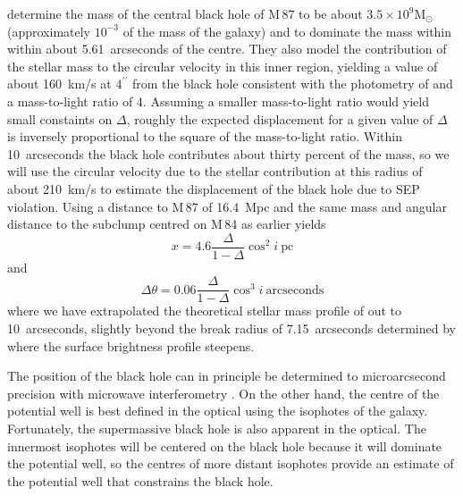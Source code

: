 \documentclass[useAMS,usenatbib]{mn2e}
\newcommand{\msun}{\mathrm{M}_\odot}
\begin{document}
\citet{2013ApJ...770...86W} determine the mass of the central black
hole of M\,87 to be about $3.5 \times 10^{9} \msun$ (approximately
$10^{-3}$ of the mass of the galaxy) and to dominate the mass within
within about 5.61~arcseconds of the centre.  They also model the
contribution of the stellar mass to the circular velocity in this
inner region, yielding a value of about 160~km/s at $4^{\prime\prime}$
from the black hole consistent with the photometry of
\citet{2006ApJS..164..334F} and a mass-to-light ratio of 4. Assuming a
smaller mass-to-light ratio would yield small constaints on $\Delta$,
roughly the expected displacement for a given value of $\Delta$ is
inversely proportional to the square of the mass-to-light ratio.
Within 10~arcseconds the black hole contributes about thirty percent
of the mass, so we will use the circular velocity due to the stellar
contribution at this radius of about 210~km/s to estimate the
displacement of the black hole due to SEP violation.  Using a distance
to M\,87 of 16.4~Mpc \citep{2010A&A...524A..71B} and the same mass and
angular distance to the subclump centred on M\,84 as earlier yields
\begin{equation}
  x = 4.6 \frac{\Delta}{1-\Delta} \cos^2 i ~\mathrm{pc}
  \label{eq:18}
\end{equation}
and
\begin{equation}
    \Delta \theta = 0.06 \frac{\Delta}{1-\Delta} \cos^3 i~
    \mathrm{arcseconds}
    \label{eq:17}
\end{equation}
where we have extrapolated the theoretical stellar mass profile of
\citet{2013ApJ...770...86W} out to 10~arcseconds, slightly beyond the
break radius of 7.15~arcseconds determined by
\cite{2006ApJS..164..334F} where the surface brightness profile
steepens.


The position of the black hole can in principle be determined to
microarcsecond precision with microwave interferometry
\citep{2011ApJ...735...57B}.  On the other hand, the centre of the
potential well is best defined in the optical using the isophotes of
the galaxy.  Fortunately, the supermassive black hole is also apparent
in the optical.  The innermost isophotes will be centered on the black
hole because it will dominate the potential well, so the centres of
more distant isophotes provide an estimate of the potential well that
constrains the black hole.
\end{document}
